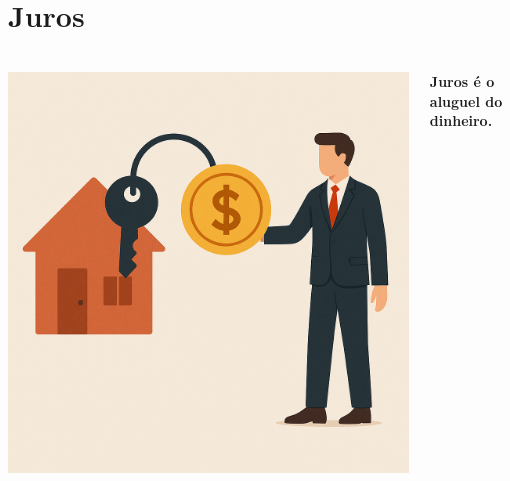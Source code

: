 \section{Juros} \label{FormProb}

\begin{frame}[c]
    \frametitle{}
    \begin{columns}
        \begin{column}{0.5\textwidth}
            \includegraphics[width=\textwidth]{../figuras/aluguel2.png}
        \end{column}
        \begin{column}{0.5\textwidth}
            \centering
            \textbf{\Large Juros é o aluguel do dinheiro.}
        \end{column}
    \end{columns}
\end{frame}

